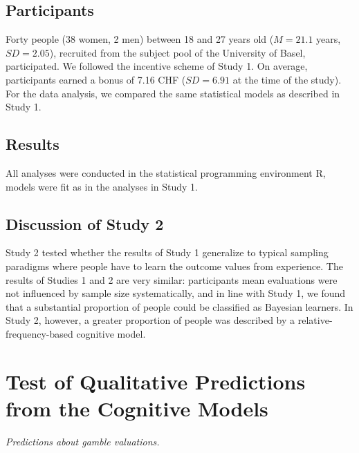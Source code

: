 \documentclass[a4paper, man, natbib, floatsintext]{apa6}
\begin{document}
\subsection{Participants}
Forty people (38 women, 2 men) between 18 and 27 years old ($M = 21.1$ years, $SD = 2.05$), recruited from the subject pool of the University of Basel, participated. We followed the incentive scheme of Study 1. On average, participants earned a bonus of 7.16 CHF ($SD = 6.91$ at the time of the study). For the data analysis, we compared the same statistical models as described in Study 1.

\subsection{Results}
All analyses were conducted in the statistical programming environment R, models were fit as in the analyses in Study 1.



\subsection{Discussion of Study 2}
Study 2 tested whether the results of Study 1  generalize to typical sampling paradigms where people have to learn the outcome values from experience. The results of Studies 1 and 2 are very similar: participants mean evaluations were not influenced by sample size systematically, and in line with Study 1, we found that a substantial proportion of people could be classified as Bayesian learners. In Study 2, however, a greater proportion of people was described by a  relative-frequency-based cognitive model.

\clearpage %

\section{Test of Qualitative Predictions from the Cognitive Models}

\textit{Predictions about gamble valuations.}
\end{document}
